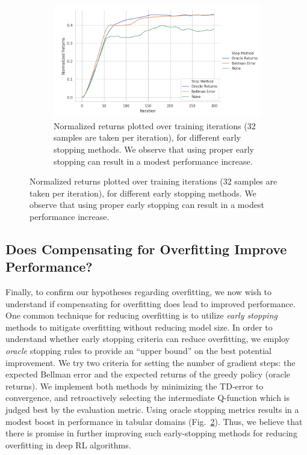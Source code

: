 \begin{figure}[ttt!]
\begin{subfigure}{0.31\linewidth}
\includegraphics[trim={0 0 4.4cm 0},clip,width=0.97\linewidth]{chapters/diagnosing_q/images/validation_stop}
\caption{\label{fig:validation_stop}Normalized returns plotted over training iterations (32 samples are taken per iteration), for different early stopping methods. We observe that using proper early stopping can result in a modest performance increase.}
\end{subfigure}
\end{figure}

\subsection{Does Compensating for Overfitting Improve Performance?}

Finally, to confirm our hypotheses regarding overfitting, we now wish to understand if compensating for overfitting does lead to improved performance. One common technique for reducing overfitting is to utilize \textit{early stopping} methods to mitigate overfitting without reducing model size.
In order to understand whether early stopping criteria can reduce overfitting, we employ \emph{oracle} stopping rules to provide an ``upper bound'' on the best potential improvement. We try two criteria for setting the number of gradient steps: the expected Bellman error and the expected returns of the greedy policy (oracle returns). We implement both methods by minimizing the TD-error to convergence, and retroactively selecting the intermediate Q-function which is judged best by the evaluation metric. Using oracle stopping metrics results in a modest boost in performance in tabular domains (Fig.~\ref{fig:validation_stop}). Thus, we believe that there is promise in further improving such early-stopping methods for reducing overfitting in deep RL algorithms.

